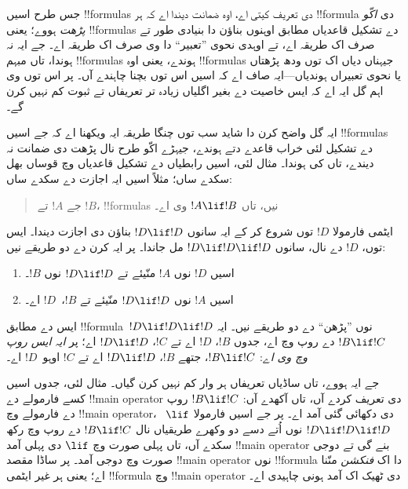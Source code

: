 \documentclass[../../../include/open-logic-section]{subfiles}
\begin{document}


\begin{explain}
جس طرح اسیں !!{formula}s دی تعریف کیتی اے، اوہ ضمانت
دیندا اے کہ ہر !!{formula} دی \emph{اکّو پڑھت} ہووے؛
یعنی !!{formula}s دے تشکیل قاعدیاں مطابق اوہنوں بناؤن
دا بنیادی طور تے صرف اک طریقہ اے، تے اوہدی نحوی ”تعبیر“
دا وی صرف اک طریقہ اے۔ جے ایہ نہ ہوندا، تاں مبہم
!!{formula}s ہوندے، یعنی اوہ !!{formula}s جیہناں
دیاں اک توں ودھ پڑھتاں یا نحوی تعبیراں ہوندیاں—ایہ صاف
اے کہ اسیں اس توں بچنا چاہندے آں۔ پر اس توں وی
اہم گل ایہ اے کہ ایس خاصیت دے بغیر اگلیاں
زیادہ تر تعریفاں تے ثبوت کم نہیں کرن گے۔

ایہ گل واضح کرن دا شاید سب توں چنگا طریقہ ایہ ویکھنا
اے کہ جے اسیں !!{formula}s دے تشکیل لئی خراب قاعدے
دتے ہوندے، جیہڑے اکّو طرح نال پڑھت دی ضمانت نہ
دیندے، تاں کی ہوندا۔ مثال لئی، اسیں رابطیاں دے
تشکیل قاعدیاں وچ قوساں بھل سکدے ساں؛ مثلاً اسیں
ایہ اجازت دے سکدے ساں:
\begin{quote}
جے $!A$ تے $!B$، !!{formula}s نیں، تاں $!A \lif !B$ وی اے۔
\end{quote}
ایٹمی فارمولا $!D$ توں شروع کر کے ایہ سانوں $!D
\lif !D$ بناؤن دی اجازت دیندا۔ ایس توں، $!D$ دے نال،
سانوں $!D \lif !D
\lif !D$ مل جاندا۔ پر ایہ کرن دے دو طریقے نیں:
\begin{enumerate}
\item اسیں $!D$ نوں $!A$ منّیئے تے $!D \lif !D$ نوں $!B$۔
\item اسیں $!A$ نوں $!D \lif !D$ منّیئے تے $!B$،~$!D$ اے۔
\end{enumerate}
ایس دے مطابق !!{formula}~$!D \lif !D \lif !D$
نوں ”پڑھن“ دے دو طریقے نیں۔ ایہ $!B
\lif !C$ دے روپ وچ اے، جدوں $!B$، $!D$ اے تے $!C$،
$!D \lif !D$ اے؛ پر \emph{ایہ ایس روپ وچ وی اے}:
$!B \lif !C$، جتھے $!B$، $!D \lif !D$ اے تے $!C$
اوہو~$!D$ اے۔

جے ایہ ہووے، تاں ساڈیاں تعریفاں ہر وار کم نہیں کرن
گیاں۔ مثال لئی، جدوں اسیں کسے فارمولے دے
!!{main operator} دی تعریف کردے آں، تاں آکھدے آں:
$!B \lif !C$ روپ دے فارمولے وچ !!{main operator}،
~$\lif$ دی دکھائی گئی آمد اے۔ پر جے اسیں فارمولا $!D
\lif !D \lif !D$ نوں اُتے دسے دو وکھرے طریقیاں نال
$!B \lif !C$ دے روپ وچ رکھ سکدے آں، تاں پہلی
صورت وچ $\lif$ دی پہلی آمد !!{main operator} بنے گی
تے دوجی صورت وچ دوجی آمد۔ پر ساڈا مقصد
!!{main operator} نوں !!{formula} دا اک \emph{فنکشن}
منّنا اے؛ یعنی ہر غیر ایٹمی !!{formula} وچ !!{main
  operator} دی ٹھیک اک آمد ہونی چاہیدی اے۔
\end{explain}
\end{document}
